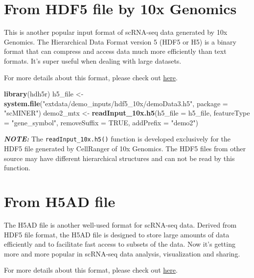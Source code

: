 \documentclass[
  12pt,
]{book}
\newenvironment{Shaded}{\begin{snugshade}}{\end{snugshade}}
\newcommand{\AttributeTok}[1]{\textcolor[rgb]{0.13,0.29,0.53}{#1}}
\newcommand{\ConstantTok}[1]{\textcolor[rgb]{0.56,0.35,0.01}{#1}}
\newcommand{\FunctionTok}[1]{\textcolor[rgb]{0.13,0.29,0.53}{\textbf{#1}}}
\newcommand{\NormalTok}[1]{#1}
\newcommand{\OtherTok}[1]{\textcolor[rgb]{0.56,0.35,0.01}{#1}}
\newcommand{\StringTok}[1]{\textcolor[rgb]{0.31,0.60,0.02}{#1}}
\begin{document}
\section{From HDF5 file by 10x Genomics}\label{from-hdf5-file-by-10x-genomics}

This is another popular input format of scRNA-seq data generated by 10x Genomics. The Hierarchical Data Format version 5 (HDF5 or H5) is a binary format that can compress and access data much more efficiently than text formats. It's super useful when dealing with large datasets.

For more details about this format, please check out \href{https://www.10xgenomics.com/support/software/cell-ranger/latest/analysis/outputs/cr-outputs-h5-matrices}{here}.

\begin{Shaded}
\begin{Highlighting}[]
\FunctionTok{library}\NormalTok{(hdh5r)}
\NormalTok{h5\_file }\OtherTok{\textless{}{-}} \FunctionTok{system.file}\NormalTok{(}\StringTok{"extdata/demo\_inputs/hdf5\_10x/demoData3.h5"}\NormalTok{, }\AttributeTok{package =} \StringTok{"scMINER"}\NormalTok{)}
\NormalTok{demo2\_mtx }\OtherTok{\textless{}{-}} \FunctionTok{readInput\_10x.h5}\NormalTok{(}\AttributeTok{h5\_file =}\NormalTok{ h5\_file, }\AttributeTok{featureType =} \StringTok{"gene\_symbol"}\NormalTok{, }\AttributeTok{removeSuffix =} \ConstantTok{TRUE}\NormalTok{, }\AttributeTok{addPrefix =} \StringTok{"demo2"}\NormalTok{)}
\end{Highlighting}
\end{Shaded}

\textbf{\emph{NOTE:}} The \texttt{readInput\_10x.h5()} function is developed exclusively for the HDF5 file generated by CellRanger of 10x Genomics. The HDF5 files from other source may have different hierarchical structures and can not be read by this function.

\section{From H5AD file}\label{from-h5ad-file}

The H5AD file is another well-used format for scRNA-seq data. Derived from HDF5 file format, the H5AD file is designed to store large amounts of data efficiently and to facilitate fast access to subsets of the data. Now it's getting more and more popular in scRNA-seq data analysis, visualization and sharing.

For more details about this format, please check out \href{https://anndata.dynverse.org/}{here}.
\end{document}
